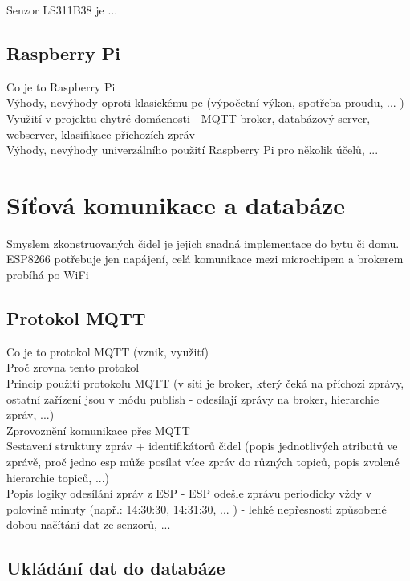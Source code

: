 Senzor LS311B38 je ...

\section{Raspberry Pi} \label{sec:example_xor}

Co je to Raspberry Pi \\
Výhody, nevýhody oproti klasickému pc (výpočetní výkon, spotřeba proudu, ... ) \\
Využití v projektu chytré domácnosti - MQTT broker, databázový server, webserver, klasifikace příchozích zpráv \\
Výhody, nevýhody univerzálního použití Raspberry Pi pro několik účelů, ... \\

\chapter{Síťová komunikace a databáze} \label{chap:methods}

Smyslem zkonstruovaných čidel je jejich snadná implementace do bytu či domu. \\
ESP8266 potřebuje jen napájení, celá komunikace mezi microchipem a brokerem probíhá po WiFi \\

\section{Protokol MQTT} \label{sec:example_xor}

Co je to protokol MQTT (vznik, využití) \\
Proč zrovna tento protokol \\
Princip použití protokolu MQTT (v síti je broker, který čeká na příchozí zprávy, ostatní zařízení jsou v módu publish - odesílají zprávy na broker, hierarchie zpráv, ...) \\
Zprovoznění komunikace přes MQTT \\ 
Sestavení struktury zpráv + identifikátorů čidel (popis jednotlivých atributů ve zprávě, proč jedno esp může posílat více zpráv do různých topiců, popis zvolené hierarchie topiců, ...) \\
Popis logiky odesílání zpráv z ESP - ESP odešle zprávu periodicky vždy v polovině minuty (např.: 14:30:30, 14:31:30, ... ) - lehké nepřesnosti způsobené dobou načítání dat ze senzorů, ... \\

\section{Ukládání dat do databáze} \label{sec:example_xor}

